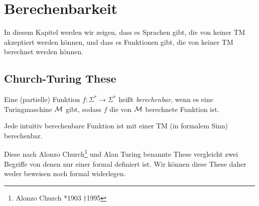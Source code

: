 \section[Berechenbarkeit]{Berechenbarkeit}


\newcommand{\bintonat}{\operatorname{bin}}
\newcommand{\nattotm}{\operatorname{nat2tm}}
\newcommand{\bintotm}{\operatorname{bin2tm}}
\newcommand{\langtopower}{\operatorname{lang2power}}
\newcommand{\functopower}{\operatorname{func2power}}


In diesem Kapitel werden wir zeigen, 
dass es Sprachen gibt, die von keiner \ac{TM} akzeptiert werden können, und
dass es Funktionen gibt, die von keiner \ac{TM} berechnet werden können.


\subsection{Church-Turing These}
\begin{Def}[name={[berechenbare Funktion]}]\label{def:berechenbar}
	Eine (partielle) Funktion $f:\Sigma^*\rightarrow\Sigma^*$ heißt \emph{berechenbar}, wenn es eine Turingmaschine $\mathcal{M}$ gibt,
	sodass $f$ die von $\mathcal{M}$ berechnete Funktion ist.
\end{Def}


\begin{These*}
	Jede intuitiv berechenbare Funktion ist mit einer \ac{TM} (in formalem Sinn) berechenbar.
\end{These*}

Diese nach Alonzo Church\footnote{Alonzo Church *1903 †1995}
und Alan Turing benannte These vergleicht zwei Begriffe von denen nur einer
formal definiert ist.
Wir können diese These daher weder beweisen noch formal widerlegen.

